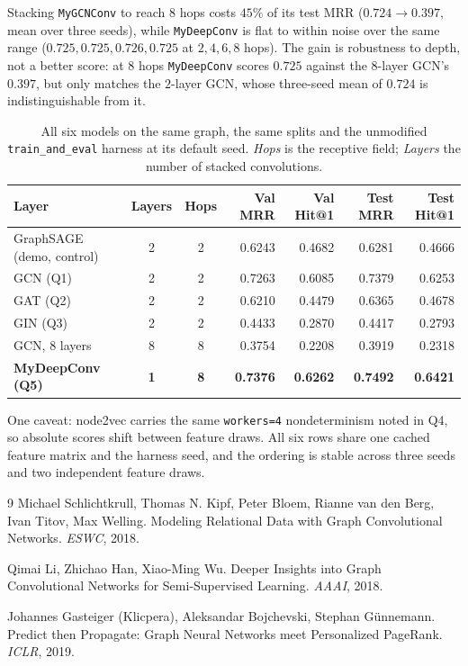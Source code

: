 \noindent
Stacking \texttt{MyGCNConv} to reach $8$ hops costs $45\%$ of its test MRR
($0.724 \to 0.397$, mean over three seeds), while \texttt{MyDeepConv} is flat to within
noise over the same range ($0.725, 0.725, 0.726, 0.725$ at $2, 4, 6, 8$ hops). The gain
is robustness to depth, not a better score: at $8$ hops \texttt{MyDeepConv} scores
$0.725$ against the $8$-layer GCN's $0.397$, but only matches the $2$-layer GCN, whose
three-seed mean of $0.724$ is indistinguishable from it.

\begin{table}[H]
  \centering
  \setlength{\tabcolsep}{4.5pt}%
  \begin{tabular}{lccrrrr}
    \toprule
    Layer & Layers & Hops & Val MRR & Val Hit@1 & Test MRR & Test Hit@1 \\
    \midrule
    GraphSAGE (demo, control) & 2 & 2 & 0.6243 & 0.4682 & 0.6281 & 0.4666 \\
    GCN (Q1)                  & 2 & 2 & 0.7263 & 0.6085 & 0.7379 & 0.6253 \\
    GAT (Q2)                  & 2 & 2 & 0.6210 & 0.4479 & 0.6365 & 0.4678 \\
    GIN (Q3)                  & 2 & 2 & 0.4433 & 0.2870 & 0.4417 & 0.2793 \\
    GCN, 8 layers             & 8 & 8 & 0.3754 & 0.2208 & 0.3919 & 0.2318 \\
    \textbf{MyDeepConv (Q5)}  & \textbf{1} & \textbf{8} & \textbf{0.7376} &
      \textbf{0.6262} & \textbf{0.7492} & \textbf{0.6421} \\
    \bottomrule
  \end{tabular}
  \caption{All six models on the same graph, the same splits and the unmodified
  \texttt{train\_and\_eval} harness at its default seed. \emph{Hops} is the
  receptive field; \emph{Layers} the number of stacked convolutions.}
  \label{p1:tab:results}
\end{table}

\noindent
One caveat: node2vec carries the same \texttt{workers=4} nondeterminism noted in Q4,
so absolute scores shift between feature draws. All six rows share one cached feature
matrix and the harness seed, and the ordering is stable across three seeds and two
independent feature draws.

\begin{thebibliography}{9}
Michael Schlichtkrull, Thomas N. Kipf, Peter Bloem, Rianne van den Berg,
Ivan Titov, Max Welling.
\newblock Modeling Relational Data with Graph Convolutional Networks.
\newblock \emph{ESWC}, 2018.

Qimai Li, Zhichao Han, Xiao-Ming Wu.
\newblock Deeper Insights into Graph Convolutional Networks for Semi-Supervised
Learning.
\newblock \emph{AAAI}, 2018.

Johannes Gasteiger (Klicpera), Aleksandar Bojchevski, Stephan G\"unnemann.
\newblock Predict then Propagate: Graph Neural Networks meet Personalized PageRank.
\newblock \emph{ICLR}, 2019.
\end{thebibliography}
